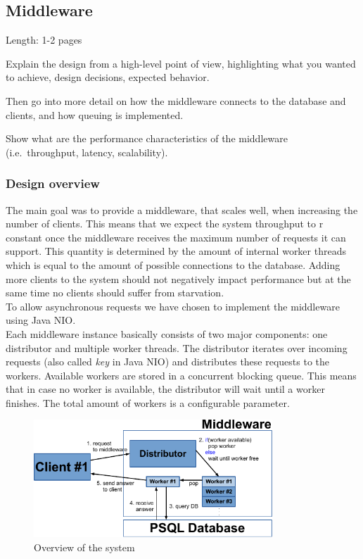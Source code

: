 \documentclass[11pt]{article}
\begin{document}
\subsection{Middleware}\label{sec:middleware}
Length: 1-2 pages

Explain the design from a high-level point of view, highlighting what
you wanted to achieve, design decisions, expected behavior.

Then go into more detail on how the middleware connects to the database
and clients, and how queuing is implemented.

Show what are the performance characteristics of the middleware
(i.e.~throughput, latency, scalability).

\subsubsection{Design overview}\label{sec:design-overview}
The main goal was to provide a middleware, that scales well, when increasing the number of clients. This means that we expect the system throughput to r constant once the middleware receives the maximum number of requests it can support. This quantity is determined by the amount of internal worker threads which is equal to the amount of possible connections to the database.
Adding more clients to the system should not negatively impact performance but at the same time no clients should suffer from starvation.
\\
To allow asynchronous requests we have chosen to implement the middleware using Java NIO.
\\
Each middleware instance basically consists of two major components: one distributor and multiple worker threads.
The distributor iterates over incoming requests (also called \textit{key} in Java NIO) and distributes these requests to the workers. Available workers are stored in a concurrent blocking queue. This means that in case no worker is available, the distributor will wait until a worker finishes. The total amount of workers is a configurable parameter.

\begin{figure}[ht!]
  \begin{center}
    \includegraphics[width=0.8\textwidth]{figures/middleware.pdf}
    \caption{Overview of the system}
    \label{fig:middleware}
  \end{center}
\end{figure}
\end{document}
